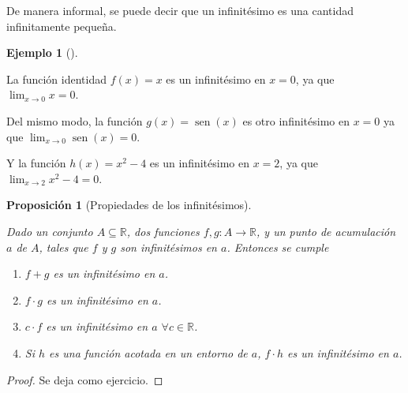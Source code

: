 \documentclass[
  a4paper,
]{scrreport}
\providecommand{\tightlist}{%
  \setlength{\itemsep}{0pt}\setlength{\parskip}{0pt}}\usepackage{longtable,booktabs,array}
\theoremstyle{definition}
\newtheorem{example}{Ejemplo}[chapter]
\theoremstyle{plain}
\theoremstyle{definition}
\theoremstyle{definition}
\theoremstyle{plain}
\theoremstyle{plain}
\newtheorem{proposition}{Proposición}[chapter]
\theoremstyle{remark}
\begin{document}
De manera informal, se puede decir que un infinitésimo es una cantidad
infinitamente pequeña.

\begin{example}[]\protect\hypertarget{exm-infinitesimos}{}\label{exm-infinitesimos}

La función identidad \(f(x)=x\) es un infinitésimo en \(x=0\), ya que
\(\lim_{x\to 0}x = 0\).

Del mismo modo, la función \(g(x)=\operatorname{sen}(x)\) es otro
infinitésimo en \(x=0\) ya que \(\lim_{x\to 0}\operatorname{sen}(x)=0\).

Y la función \(h(x)=x^2-4\) es un infinitésimo en \(x=2\), ya que
\(\lim_{x\to 2}x^2-4 = 0\).

\end{example}

\begin{proposition}[Propiedades de los
infinitésimos]\protect\hypertarget{prp-propiedades-infinitesimos}{}\label{prp-propiedades-infinitesimos}

Dado un conjunto \(A\subseteq \mathbb{R}\), dos funciones
\(f,g:A\to \mathbb{R}\), y un punto de acumulación \(a\) de \(A\), tales
que \(f\) y \(g\) son infinitésimos en \(a\). Entonces se cumple

\begin{enumerate}
\def\labelenumi{\arabic{enumi}.}
\tightlist
\item
  \(f+g\) es un infinitésimo en \(a\).
\item
  \(f\cdot g\) es un infinitésimo en \(a\).
\item
  \(c\cdot f\) es un infinitésimo en \(a\) \(\forall c\in\mathbb{R}\).
\item
  Si \(h\) es una función acotada en un entorno de \(a\), \(f\cdot h\)
  es un infinitésimo en \(a\).
\end{enumerate}

\end{proposition}

\begin{tcolorbox}[enhanced jigsaw, leftrule=.75mm, colbacktitle=quarto-callout-note-color!10!white, toprule=.15mm, opacityback=0, opacitybacktitle=0.6, toptitle=1mm, breakable, bottomtitle=1mm, colframe=quarto-callout-note-color-frame, rightrule=.15mm, titlerule=0mm, title=\textcolor{quarto-callout-note-color}{\faInfo}\hspace{0.5em}{Demostración}, arc=.35mm, left=2mm, bottomrule=.15mm, colback=white, coltitle=black]

\begin{proof}
Se deja como ejercicio.
\end{proof}

\end{tcolorbox}
\end{document}
